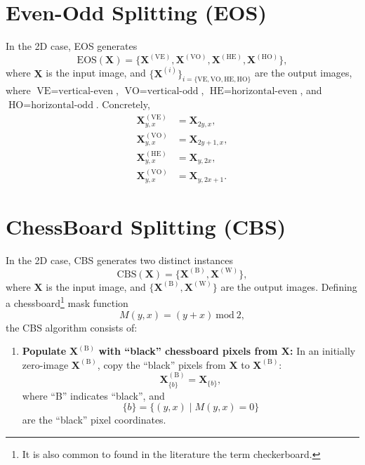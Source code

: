 \begin{subappendices}

\section{Even-Odd Splitting (EOS)}
\label{sec:EOS}

In the 2D case, \gls{EOS} generates
\begin{equation}
  \mathrm{EOS}(\mathbf{X})=\{\mathbf{X}^{(\text{VE})}, \mathbf{X}^{(\text{VO})}, \mathbf{X}^{(\text{HE})}, \mathbf{X}^{(\text{HO})}\},
\end{equation}
where $\mathbf{X}$ is the input image, and $\{\mathbf{X}^{(i)}\}_{i=\{\text{VE}, \text{VO}, \text{HE}, \text{HO}\}}$
  are the output images, where $\text{VE}=\text{vertical-even}$,
  $\text{VO}=\text{vertical-odd}$, $\text{HE}=\text{horizontal-even}$,
  and $\text{HO}=\text{horizontal-odd}$. Concretely,
  \begin{align}
    \mathbf{X}^{(\text{VE})}_{y,x} & = \mathbf{X}_{2y,x}, \\
    \mathbf{X}^{(\text{VO})}_{y,x} & = \mathbf{X}_{2y+1,x}, \\
    \mathbf{X}^{(\text{HE})}_{y,x} & = \mathbf{X}_{y,2x},\\
    \mathbf{X}^{(\text{VO})}_{y,x} & = \mathbf{X}_{y,2x+1}.
  \end{align}
  

\section{ChessBoard Splitting (CBS)}
\label{sec:CBS}

In the 2D case, \gls{CBS} generates two distinct
instances
\begin{equation}
  \mathrm{CBS}(\mathbf{X})=\{\mathbf{X}^{(\text{B})},\mathbf{X}^{(\text{W})}\},
\end{equation}
where $\mathbf{X}$ is the input image, and
$\{\mathbf{X}^{(\text{B})},\mathbf{X}^{(\text{W})}\}$ are the output
images. Defining a chessboard\footnote{It is also common to found in
  the literature the term checkerboard.} mask function
\begin{equation}
  M(y,x)=(y+x)~\text{mod}~2,
\end{equation}
the CBS algorithm consists of:
\begin{enumerate}
\item \textbf{Populate} $\mathbf{X}^{(\text{B})}$ \textbf{with
    ``black'' chessboard pixels from $\mathbf{X}$:} In an initially
  zero-image $\mathbf{X}^{(\text{B})}$, copy the ``black'' pixels from
  $\mathbf{X}$ to $\mathbf{X}^{(\text{B})}$:
  \begin{equation}
    \mathbf{X}^{(\text{B})}_{\{b\}} = \mathbf{X}_{\{b\}},
    \label{eq:copy_blacks}
  \end{equation}
  where ``B'' indicates ``black'', and
  \begin{equation}
    \{b\} = \{(y, x) \mid M(y, x)=0\}
    \label{eq:black_pixels}
  \end{equation}
  are the ``black'' pixel coordinates.
  

\end{enumerate}
\end{subappendices}
